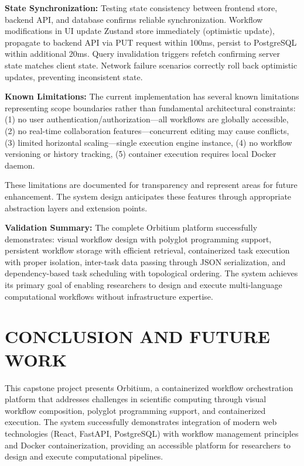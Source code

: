 \documentclass[12pt]{article}
\begin{document}
\textbf{State Synchronization:} Testing state consistency between frontend store, backend API, and database confirms reliable synchronization. Workflow modifications in UI update Zustand store immediately (optimistic update), propagate to backend API via PUT request within 100ms, persist to PostgreSQL within additional 20ms. Query invalidation triggers refetch confirming server state matches client state. Network failure scenarios correctly roll back optimistic updates, preventing inconsistent state.

\textbf{Known Limitations:} The current implementation has several known limitations representing scope boundaries rather than fundamental architectural constraints: (1) no user authentication/authorization---all workflows are globally accessible, (2) no real-time collaboration features---concurrent editing may cause conflicts, (3) limited horizontal scaling---single execution engine instance, (4) no workflow versioning or history tracking, (5) container execution requires local Docker daemon.

These limitations are documented for transparency and represent areas for future enhancement. The system design anticipates these features through appropriate abstraction layers and extension points.

\textbf{Validation Summary:} The complete Orbitium platform successfully demonstrates: visual workflow design with polyglot programming support, persistent workflow storage with efficient retrieval, containerized task execution with proper isolation, inter-task data passing through JSON serialization, and dependency-based task scheduling with topological ordering. The system achieves its primary goal of enabling researchers to design and execute multi-language computational workflows without infrastructure expertise.

\newpage
\section{CONCLUSION AND FUTURE WORK}

This capstone project presents Orbitium, a containerized workflow orchestration platform that addresses challenges in scientific computing through visual workflow composition, polyglot programming support, and containerized execution. The system successfully demonstrates integration of modern web technologies (React, FastAPI, PostgreSQL) with workflow management principles and Docker containerization, providing an accessible platform for researchers to design and execute computational pipelines.
\end{document}

